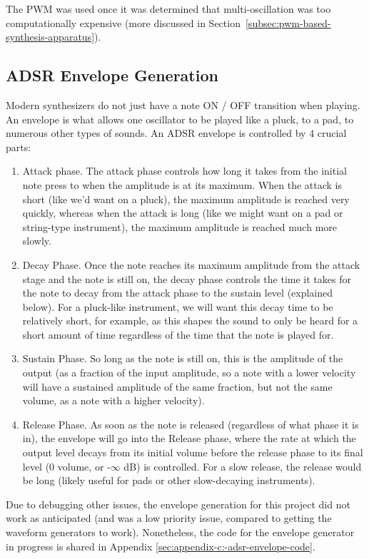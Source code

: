 The PWM was used once it was determined that multi-oscillation was too computationally expensive (more discussed in Section~\ref{subsec:pwm-based-synthesis-apparatus}).


\subsection{ADSR Envelope Generation}\label{subsec:envelope-generation-theory}

Modern synthesizers do not just have a note ON / OFF transition when playing. An envelope is what allows one oscillator to be played like a pluck, to a pad, to  numerous other types of sounds. An ADSR envelope is controlled by 4 crucial parts:


\begin{enumerate}
    \item Attack phase. The attack phase controls how long it takes from the initial note press to when the amplitude is at its maximum. When the attack is short (like we'd want on a pluck), the maximum amplitude is reached very quickly, whereas when the attack is long (like we might want on a pad or string-type instrument), the maximum amplitude is reached much more slowly. 
    \item Decay Phase. Once the note reaches its maximum amplitude from the attack stage and the note is still on, the decay phase controls the time it takes for the note to decay from the attack phase to the sustain level (explained below). For a pluck-like instrument, we will want this decay time to be relatively short, for example, as this shapes the sound to only be heard for a short amount of time regardless of the time that the note is played for. 
    \item Sustain Phase. So long as the note is still on, this is the amplitude of the output (as a fraction of the input amplitude, so a note with a lower velocity will have a sustained amplitude of the same fraction, but not the same volume, as a note with a higher velocity). 
    \item Release Phase. As soon as the note is released (regardless of what phase it is in), the envelope will go into the Release phase, where the rate at which the output level decays from its initial volume before the release phase to its final level (0 volume, or -$\infty$ dB) is controlled. For a slow release, the release would be long (likely useful for pads or other slow-decaying instruments). 
\end{enumerate}

Due to debugging other issues, the envelope generation for this project did not work as anticipated (and was a low priority issue, compared to getting the waveform generators to work). Nonetheless, the code for the envelope generator in progress is shared in Appendix \ref{sec:appendix-c:-adsr-envelope-code}. 